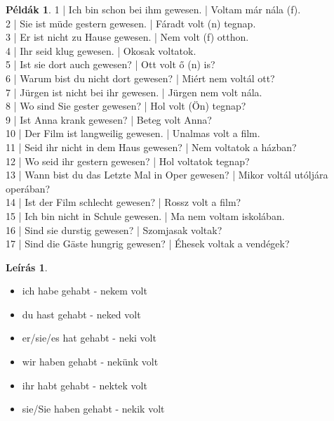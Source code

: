 \documentclass{article}
\theoremstyle{definition}
\newtheorem*{exmp}{Példák}
\newtheorem*{desc}{Leírás}
\begin{document}
\begin{exmp}	%
1 | Ich bin schon bei ihm gewesen. | Voltam már nála (f).\\
2 | Sie ist müde gestern gewesen. | Fáradt volt (n) tegnap.\\
3 | Er ist nicht zu Hause gewesen. | Nem volt (f) otthon.\\
4 | Ihr seid klug gewesen. | Okosak voltatok.\\
5 | Ist sie dort auch gewesen? | Ott volt ő (n) is?\\
6 | Warum bist du nicht dort gewesen? | Miért nem voltál ott?\\
7 | Jürgen ist nicht bei ihr gewesen. | Jürgen nem volt nála.\\
8 | Wo sind Sie gester gewesen? | Hol volt (Ön) tegnap?\\
9 | Ist Anna krank gewesen? | Beteg volt Anna?\\
10 | Der Film ist langweilig gewesen. | Unalmas volt a film.\\
11 | Seid ihr nicht in dem Haus gewesen? | Nem voltatok a házban?\\
12 | Wo seid ihr gestern gewesen? | Hol voltatok tegnap?\\
13 | Wann bist du das Letzte Mal in Oper gewesen? | Mikor voltál utóljára operában?\\
14 | Ist der Film schlecht gewesen? | Rossz volt a film?\\
15 | Ich bin nicht in Schule gewesen. | Ma nem voltam iskolában.\\
16 | Sind sie durstig gewesen? | Szomjasak voltak?\\
17 | Sind die Gäste hungrig gewesen? | Éhesek voltak a vendégek?\\
\end{exmp}

\begin{desc}
\begin{itemize}
\item ich habe gehabt - nekem volt
\item du hast gehabt - neked volt
\item er/sie/es hat gehabt - neki volt
\item wir haben gehabt - nekünk volt
\item ihr habt gehabt - nektek volt
\item sie/Sie haben gehabt - nekik volt
\end{itemize}
\end{desc}
\end{document}
